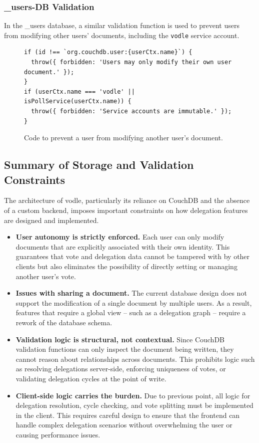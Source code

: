 \subsubsection{\_users-DB Validation}
In the \_users database, a similar validation function is used to prevent users from modifying other users' documents, including the \texttt{vodle} service account.
\begin{figure}[H]
\begin{verbatim}
if (id !== `org.couchdb.user:{userCtx.name}`) {
  throw({ forbidden: 'Users may only modify their own user document.' });
}
if (userCtx.name === 'vodle' || isPollService(userCtx.name)) {
  throw({ forbidden: 'Service accounts are immutable.' });
}
\end{verbatim}
\caption{Code to prevent a user from modifying another user's document.}
\end{figure}

\subsection{Summary of Storage and Validation Constraints}
\label{subsec:summary_storage_constraints}

The architecture of vodle, particularly its reliance on CouchDB and the absence of a custom backend, imposes important constraints on how delegation features are designed and implemented.

\begin{itemize}
  \item \textbf{User autonomy is strictly enforced.} Each user can only modify documents that are explicitly associated with their own identity. This guarantees that vote and delegation data cannot be tampered with by other clients but also eliminates the possibility of directly setting or managing another user's vote.

  \item \textbf{Issues with sharing a document.} The current database design does not support the modification of a single document by multiple users. As a result, features that require a global view -- such as a delegation graph -- require a rework of the database schema.

  \item \textbf{Validation logic is structural, not contextual.} Since CouchDB validation functions can only inspect the document being written, they cannot reason about relationships across documents. This prohibits logic such as resolving delegations server-side, enforcing uniqueness of votes, or validating delegation cycles at the point of write.

  \item \textbf{Client-side logic carries the burden.} Due to previous point, all logic for delegation resolution, cycle checking, and vote splitting must be implemented in the client. This requires careful design to ensure that the frontend can handle complex delegation scenarios without overwhelming the user or causing performance issues.
\end{itemize}

